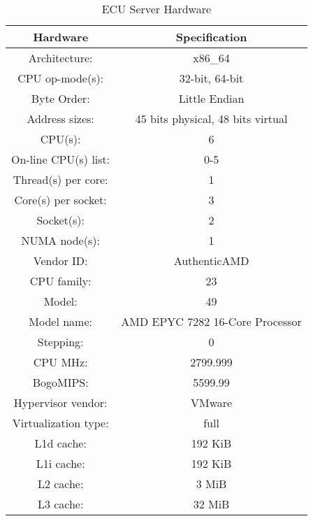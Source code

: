 \documentclass[conference]{IEEEtran}
\begin{document}
\begin{table}[tp!]
\begin{center}
\begin{tabular}{ |c|c| }
	\hline
	{Hardware} & {Specification} \\
	\hline
	\hline
    Architecture:         &   x86\_64 \\
    CPU op-mode(s):       &   32-bit, 64-bit \\
    Byte Order:           &   Little Endian \\
    Address sizes:        &   45 bits physical, 48 bits virtual \\
    CPU(s):               &   6 \\
    On-line CPU(s) list:  &   0-5 \\
    Thread(s) per core:   &   1 \\
    Core(s) per socket:   &   3 \\
    Socket(s):            &   2 \\
    NUMA node(s):         &   1 \\
    Vendor ID:            &   AuthenticAMD \\
    CPU family:           &   23 \\
    Model:                &   49 \\
    Model name:           &   AMD EPYC 7282 16-Core Processor \\
    Stepping:             &   0 \\
    CPU MHz:              &   2799.999 \\
    BogoMIPS:             &   5599.99 \\
    Hypervisor vendor:    &   VMware \\
    Virtualization type:  &   full \\
    L1d cache:            &   192 KiB \\
    L1i cache:            &   192 KiB \\
    L2 cache:             &   3 MiB \\
    L3 cache:             &   32 MiB \\
	\hline
\end{tabular}
\newline
\caption{\label{tab:Table 1}ECU Server Hardware}
\end{center}
\end{table}
\end{document}
